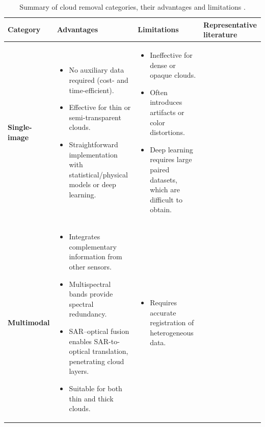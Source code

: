 \begin{table}[ht]
\centering
\caption[Cloud removal method categories]{Summary of cloud removal categories, their advantages and limitations \cite{CR_Advances_Review_ORS, sar_2_opt_CGAN_survey_taxonomy}.}
\label{tab:cloud_removal_categories}
\begin{adjustbox}{max width=\textwidth, keepaspectratio=false}
\begin{tabular}{p{2.5cm} p{6cm} p{6cm} p{3cm}}
\toprule
\textbf{Category} & \textbf{Advantages} & \textbf{Limitations} & \textbf{Representative literature} \\
\midrule
\textbf{Single-image} & 
\begin{itemize}[nosep,leftmargin=*]
  \item No auxiliary data required (cost- and time-efficient).
  \item Effective for thin or semi-transparent clouds.
  \item Straightforward implementation with statistical/physical models or deep learning.
\end{itemize} &
\begin{itemize}[nosep,leftmargin=*]
  \item Ineffective for dense or opaque clouds.
  \item Often introduces artifacts or color distortions.
  \item Deep learning requires large paired datasets, which are difficult to obtain.
\end{itemize} &
\cite{single_variation} \cite{single_haze_removal_dark_prior} \cite{single_artifact_free_CR_GAN} \cite{single_thin_CR_ORS_GAN_phys} \cite{single_multi_DR_CR} \cite{single_CR_DLM_matting} \cite{single_AGLC_GAN} \cite{single_PNBT_CR} \cite{single_CGAN_scattering_martian} \\
\midrule
\textbf{Multimodal} &
\begin{itemize}[nosep,leftmargin=*]
  \item Integrates complementary information from other sensors.
  \item Multispectral bands provide spectral redundancy.
  \item SAR–optical fusion enables SAR-to-optical translation, penetrating cloud layers.
  \item Suitable for both thin and thick clouds.
\end{itemize} &
\begin{itemize}[nosep,leftmargin=*]
  \item Requires accurate registration of heterogeneous data.

\end{itemize}
\end{tabular}
\end{adjustbox}
\end{table}
